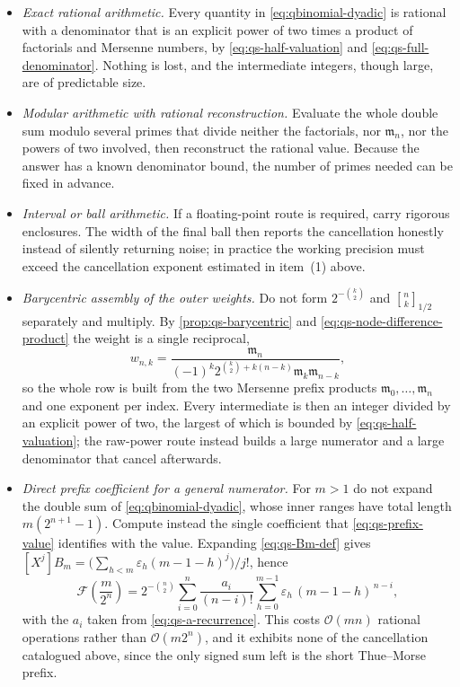\documentclass[11pt,oneside]{article}
\theoremstyle{definition}
\theoremstyle{remark}
\newcommand{\bigO}{\mathcal O}
\newcommand{\qbinom}[3]{\genfrac{[}{]}{0pt}{}{#1}{#2}_{#3}}
\begin{document}
\begin{itemize}
\item \emph{Exact rational arithmetic.}  Every quantity in \eqref{eq:qbinomial-dyadic} is
rational with a denominator that is an explicit power of two times a product of factorials
and Mersenne numbers, by \eqref{eq:qs-half-valuation} and \eqref{eq:qs-full-denominator}.
Nothing is lost, and the intermediate integers, though large, are of predictable size.
\item \emph{Modular arithmetic with rational reconstruction.}  Evaluate the whole double sum
modulo several primes that divide neither the factorials, nor $\mathfrak m_n$, nor the powers
of two involved, then reconstruct the rational value.  Because the answer has a known
denominator bound, the number of primes needed can be fixed in advance.
\item \emph{Interval or ball arithmetic.}  If a floating-point route is required, carry
rigorous enclosures.  The width of the final ball then reports the cancellation honestly
instead of silently returning noise; in practice the working precision must exceed the
cancellation exponent estimated in item~(1) above.

\item \emph{Barycentric assembly of the outer weights.}  Do not form $2^{-\binom k2}$ and
$\qbinom nk{1/2}$ separately and multiply.  By \cref{prop:qs-barycentric} and
\eqref{eq:qs-node-difference-product} the weight is a single reciprocal,
\begin{equation*}
 w_{n,k}=\frac{\mathfrak m_n}
 {(-1)^k2^{\binom k2+k(n-k)}\mathfrak m_k\mathfrak m_{n-k}},
\end{equation*}
so the whole row is built from the two Mersenne prefix products
$\mathfrak m_0,\ldots,\mathfrak m_n$ and one exponent per index.  Every intermediate is then
an integer divided by an explicit power of two, the largest of which is bounded by
\eqref{eq:qs-half-valuation}; the raw-power route instead builds a large numerator and a
large denominator that cancel afterwards.
\item \emph{Direct prefix coefficient for a general numerator.}  For $m>1$ do not expand the
double sum of \eqref{eq:qbinomial-dyadic}, whose inner ranges have total length
$m(2^{n+1}-1)$.  Compute instead the single coefficient that
\eqref{eq:qs-prefix-value} identifies with the value.  Expanding \eqref{eq:qs-Bm-def} gives
$[X^j]B_m=\bigl(\sum_{h<m}\varepsilon_h(m-1-h)^j\bigr)/j!$, hence
\begin{equation*}
 \mathcal F\!\left(\frac m{2^n}\right)
 =2^{-\binom n2}\sum_{i=0}^{n}\frac{a_i}{(n-i)!}
 \sum_{h=0}^{m-1}\varepsilon_h\,(m-1-h)^{\,n-i},
\end{equation*}
with the $a_i$ taken from \eqref{eq:qs-a-recurrence}.  This costs $\bigO(mn)$ rational
operations rather than $\bigO(m2^n)$, and it exhibits none of the cancellation catalogued
above, since the only signed sum left is the short Thue--Morse prefix.
\end{itemize}
\end{document}
